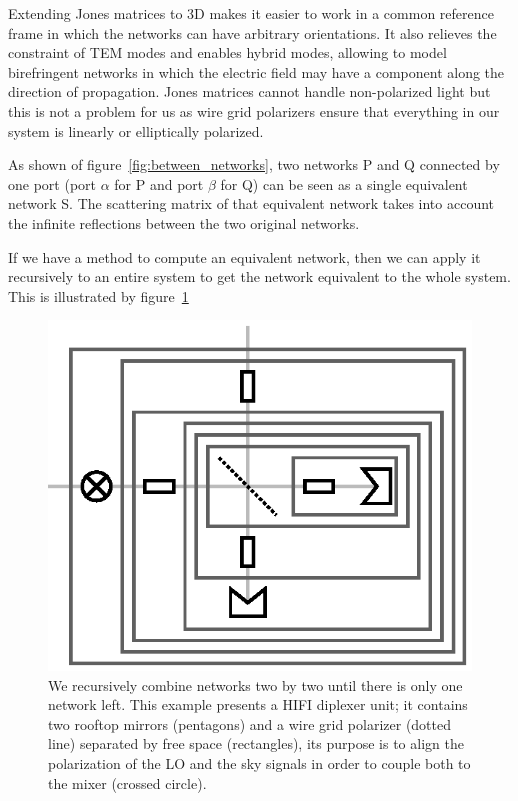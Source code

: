 \documentclass[a4paper,11pt]{article}
\begin{document}
Extending Jones matrices to 3D makes it easier to work in a common reference frame in which the networks can have arbitrary orientations.
It also relieves the constraint of TEM modes and enables hybrid modes, allowing to model birefringent networks in which the electric field may have a component along the direction of propagation.
Jones matrices cannot handle non-polarized light but this is not a problem for us as wire grid polarizers ensure that everything in our system is linearly or elliptically polarized.

As shown of figure~\ref{fig:between_networks}, two networks P and Q connected by one port (port $\alpha$ for P and port $\beta$ for Q) can be seen as a single equivalent  network S.
The scattering matrix of that equivalent network takes into account the infinite reflections between the two original networks.

If we have a method to compute an equivalent network, then we can apply it recursively to an entire system to get the network equivalent to the whole system.
This is illustrated by figure~\ref{fig:cascading_example}
\begin{figure}[hbtp]
    \centering
    \includegraphics{cascading_example}
    \caption{\label{fig:cascading_example}
    We recursively combine networks two by two until there is only one network left.
    This example presents a HIFI diplexer unit; it contains two rooftop mirrors (pentagons) and a wire grid polarizer (dotted line) separated by free space (rectangles), its purpose is to align the polarization of the LO and the sky signals in order to couple both to the mixer (crossed circle).
    }
\end{figure}
\end{document}
